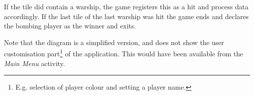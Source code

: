 If the tile did contain a warship, the game registers this as a hit and process data accordingly. If the last tile of the last warship was hit the game ends and declares the bombing player as the winner and exits.

Note that the diagram is a simplified version, and does not show the user customisation part\footnote{E.g. selection of player colour and setting a player name.} of the application. This would have been available from the \emph{Main Menu} activity.

